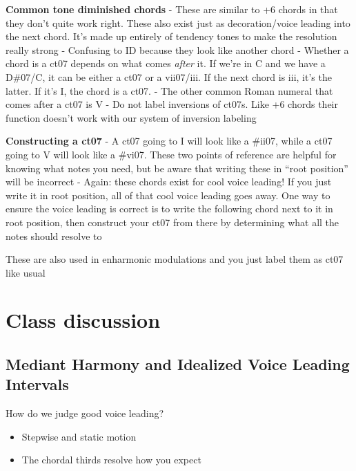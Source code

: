 \documentclass{book}
\begin{document}
\textbf{Common tone diminished chords} - These are similar to +6 chords in
that they don't quite work right. These also exist just as decoration/voice
leading into the next chord. It's made up entirely of tendency tones to make
the resolution really strong - Confusing to ID because they look like another
chord - Whether a chord is a ct07 depends on what comes \emph{after} it. If
we're in C and we have a D\#07/C, it can be either a ct07 or a vii07/iii. If
the next chord is iii, it's the latter. If it's I, the chord is a ct07. - The
other common Roman numeral that comes after a ct07 is V - Do not label
inversions of ct07s. Like +6 chords their function doesn't work with our
system of inversion labeling

\textbf{Constructing a ct07} - A ct07 going to I will look like a \#ii07,
while a ct07 going to V will look like a \#vi07. These two points of reference
are helpful for knowing what notes you need, but be aware that writing these
in ``root position'' will be incorrect - Again: these chords exist for cool
voice leading! If you just write it in root position, all of that cool voice
leading goes away. One way to ensure the voice leading is correct is to write
the following chord next to it in root position, then construct your ct07 from
there by determining what all the notes should resolve to

These are also used in enharmonic modulations and you just label them as ct07
like usual

\hypertarget{class-discussion-38}{%
\chapter{Class discussion}\label{class-discussion-38}}

\hypertarget{mediant-harmony-and-idealized-voice-leading-intervals}{%
\section{Mediant Harmony and Idealized Voice Leading
Intervals}\label{mediant-harmony-and-idealized-voice-leading-intervals}}

How do we judge good voice leading?

\begin{itemize}
\item
  Stepwise and static motion
\item
  The chordal thirds resolve how you expect
\end{itemize}
\end{document}
